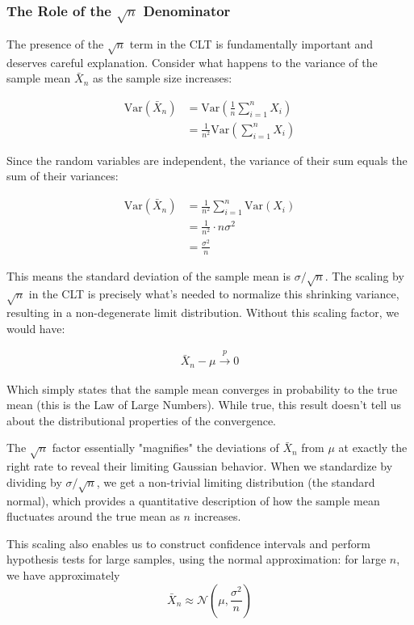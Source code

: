 \documentclass{article}
\begin{document}
\subsubsection{The Role of the $\sqrt{n}$ Denominator}

The presence of the $\sqrt{n}$ term in the CLT is fundamentally important and deserves careful explanation. Consider what happens to the variance of the sample mean $\bar{X}_n$ as the sample size increases:

\begin{align*}
\text{Var}(\bar{X}_n) &= \text{Var}\left(\frac{1}{n}\sum_{i=1}^{n}X_i\right) \\
&= \frac{1}{n^2}\text{Var}\left(\sum_{i=1}^{n}X_i\right)
\end{align*}

Since the random variables are independent, the variance of their sum equals the sum of their variances:

\begin{align*}
\text{Var}(\bar{X}_n) &= \frac{1}{n^2}\sum_{i=1}^{n}\text{Var}(X_i) \\
&= \frac{1}{n^2} \cdot n\sigma^2 \\
&= \frac{\sigma^2}{n}
\end{align*}

This means the standard deviation of the sample mean is $\sigma/\sqrt{n}$. The scaling by $\sqrt{n}$ in the CLT is precisely what's needed to normalize this shrinking variance, resulting in a non-degenerate limit distribution. Without this scaling factor, we would have:

\begin{align*}
\bar{X}_n - \mu \stackrel{p}{\to} 0
\end{align*}

Which simply states that the sample mean converges in probability to the true mean (this is the Law of Large Numbers). While true, this result doesn't tell us about the distributional properties of the convergence.

The $\sqrt{n}$ factor essentially "magnifies" the deviations of $\bar{X}_n$ from $\mu$ at exactly the right rate to reveal their limiting Gaussian behavior. When we standardize by dividing by $\sigma/\sqrt{n}$, we get a non-trivial limiting distribution (the standard normal), which provides a quantitative description of how the sample mean fluctuates around the true mean as $n$ increases.

This scaling also enables us to construct confidence intervals and perform hypothesis tests for large samples, using the normal approximation: for large $n$, we have approximately
\[
\bar{X}_n \approx \mathcal{N}\left(\mu, \frac{\sigma^2}{n}\right)
\]
\end{document}
